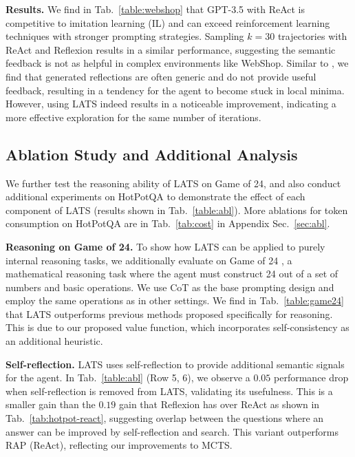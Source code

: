 \documentclass{article}
\theoremstyle{plain}
\theoremstyle{definition}
\theoremstyle{remark}
\begin{document}
\textbf{Results.} We find in Tab.~\ref{table:webshop} that GPT-3.5 with ReAct is competitive to imitation learning (IL) and can exceed reinforcement learning techniques with stronger prompting strategies. Sampling $k=30$ trajectories with ReAct and Reflexion results in a similar performance, suggesting the semantic feedback is not as helpful in complex environments like WebShop. Similar to \citet{shinn2023reflexion}, we find that generated reflections are often generic and do not provide useful feedback, resulting in a tendency for the agent to become stuck in local minima. However, using LATS indeed results in a noticeable improvement, indicating a more effective exploration for the same number of iterations.






\subsection{Ablation Study and Additional Analysis}%

We further test the reasoning ability of LATS on Game of 24, and also conduct additional experiments on HotPotQA to demonstrate the effect of each component of LATS (results shown in Tab.~\ref{table:abl}). %
More ablations for token consumption on HotPotQA are in Tab.~\ref{tab:cost} in Appendix Sec.~\ref{sec:abl}. 

\textbf{Reasoning on Game of 24.} To show how LATS can be applied to purely internal reasoning tasks, we additionally evaluate on Game of 24 \cite{yao2023tree}, a mathematical reasoning task where the agent must construct 24 out of a set of numbers and basic operations. We use CoT as the base prompting design and employ the same operations as in other settings. We find in Tab.~\ref{table:game24} that LATS outperforms previous methods proposed specifically for reasoning. This is due to our proposed value function, which incorporates self-consistency as an additional heuristic. 



\textbf{Self-reflection.} LATS uses self-reflection to provide additional semantic signals for the agent. In Tab.~\ref{table:abl} (Row 5, 6), we observe a $0.05$ performance drop when self-reflection is removed from LATS, validating its usefulness. This is a smaller gain than the $0.19$ gain that Reflexion has over ReAct as shown in Tab.~\ref{tab:hotpot-react}, suggesting overlap between the questions where an answer can be improved by self-reflection and search. This variant outperforms RAP (ReAct), reflecting our improvements to MCTS.
\end{document}
